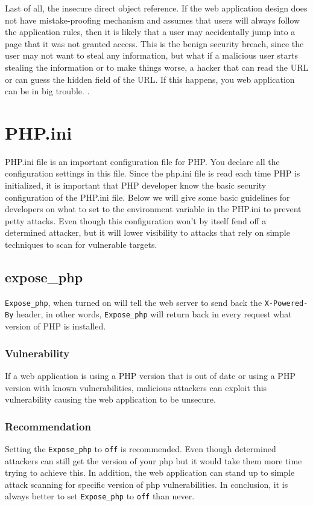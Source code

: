 \documentclass[conference]{IEEEtran}
\begin{document}
Last of all, the insecure direct object reference. If the web application design does not have mistake-proofing mechanism and assumes that users will always follow the application rules, 
then it is likely that a user may accidentally jump into a page that it was not granted access. This is the benign security breach, since the user may not want to steal any information, 
but what if a malicious user starts stealing the information or to make things worse, a hacker that can read the URL or can guess the hidden field of the URL\cite{Michael}. 
If this happens, you web application can be in big trouble.  \cite{Test}.

\section{PHP.ini}
PHP.ini file is an important configuration file for PHP. You declare all the configuration settings in this file. Since the php.ini file is read each time PHP is initialized, it is important that
PHP developer know the basic security configuration of the PHP.ini file. Below we will give some basic guidelines for developers on what to set to the environment variable in the PHP.ini
to prevent petty attacks. Even though this configuration won't by itself fend off a determined attacker, but it will lower visibility to attacks that rely on simple techniques to scan for vulnerable targets\cite{phpini}.
 
\subsection{expose\_php}
\texttt{Expose\_php}, when turned on will tell the web server to send back the \texttt{X-Powered-By} header, in other words, \texttt{Expose\_php} will return back in every request what version of PHP is installed.
\subsubsection{Vulnerability}
If a web application is using a PHP version that is out of date or using a PHP version with known vulnerabilities, malicious attackers can exploit this vulnerability causing the web application to be 
unsecure\cite{exposephp}.
\subsubsection{Recommendation}
Setting the \texttt{Expose\_php} to \texttt{off} is recommended. Even though determined attackers can still get the version of your php but it would take them more time trying to achieve this. In addition,
 the web application can stand up to simple attack scanning for specific version of php vulnerabilities. In conclusion, it is always better to set \texttt{Expose\_php} to \texttt{off} than never.
 
\end{document}
